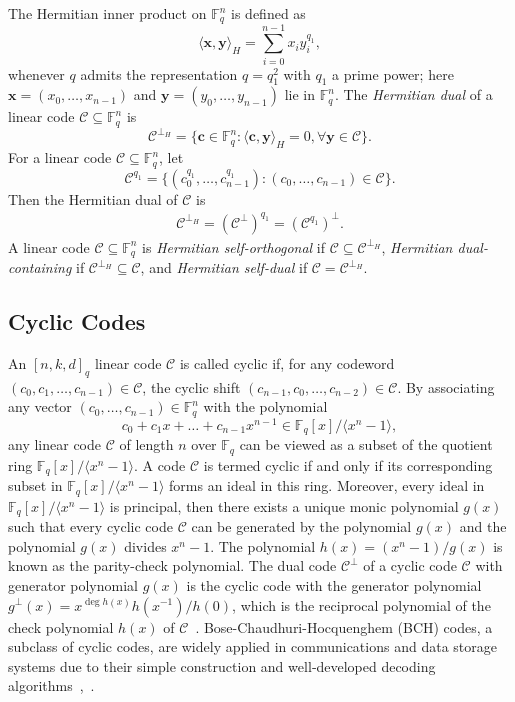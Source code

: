 \documentclass[journal,12pt,onecolumn]{IEEEtran}
\begin{document}
The Hermitian inner product on $\mathbb{F}_q^n$ is defined as
\[
\langle \mathbf{x}, \mathbf{y} \rangle_H = \sum_{i=0}^{n-1} x_i y_i^{q_1},
\]
whenever $q$ admits the representation $q = q_1^2$ with $q_1$ a prime power; here $\mathbf{x} = (x_0,\dots,x_{n-1})$ and $\mathbf{y} = (y_0,\dots,y_{n-1})$ lie in $\mathbb{F}_q^n$.  The \textit{Hermitian dual} of a linear code $\mathcal{C}\subseteq\mathbb{F}_q^n$ is \[\mathcal{C}^{\perp_H}=\{\textbf{c}\in \mathbb{F}_q^n:\langle\textbf{c},\textbf{y}\rangle_H=0,\forall\textbf{y}\in \mathcal{C}\}.\]
For a linear code $\mathcal{C}\subseteq\mathbb{F}_q^n$, let\[\mathcal{C}^{q_1}=\{(c_0^{q_1},\dots,c_{n-1}^{q_1}):(c_0,\dots,c_{n-1})\in\mathcal{C}\}.\]
Then the Hermitian dual of $\mathcal{C}$ is
\begin{align}
    \label{(1)}
    \mathcal{C}^{\perp_H}=(\mathcal{C}^\perp)^{q_1}=(\mathcal{C}^{q_1})^\perp.
\end{align}
A linear code $\mathcal{C}\subseteq\mathbb{F}_q^n$ is \textit{Hermitian self-orthogonal} if $\mathcal{C}\subseteq \mathcal{C}^{\perp_H}$, \textit{Hermitian dual-containing} if $\mathcal{C}^{\perp_H}\subseteq\mathcal{C}$, and \textit{Hermitian self-dual} if $\mathcal{C}=\mathcal{C}^{\perp_H}$.

\subsection{Cyclic Codes}
An $[n,k,d]_q$ linear code $\mathcal{C}$ is called cyclic if, for any codeword $(c_0,c_1,\dots,c_{n-1})\in\mathcal{C}$, the cyclic shift $(c_{n-1},c_0,\dots,c_{n-2})\in\mathcal{C}$. By associating any vector $(c_0,\dots,c_{n-1})\in\mathbb{F}_q^n$ with the polynomial \[c_0+c_1x+\dots +c_{n-1}x^{n-1}\in\mathbb{F}_q[x]/\langle x^n-1\rangle,\]
any linear code $\mathcal{C}$ of length $n$ over $\mathbb{F}_q$ can be viewed as a subset of the quotient ring $\mathbb{F}_q[x]/\langle x^n-1\rangle$. A code $\mathcal{C}$ is termed cyclic if and only if its corresponding subset in $\mathbb{F}_q[x]/\langle x^n-1\rangle$ forms an ideal in this ring. Moreover, every ideal in $\mathbb{F}_q[x]/\langle x^n-1\rangle$ is principal, then there exists a unique monic polynomial $g(x)$ such that every cyclic code $\mathcal{C}$ can be generated by the polynomial $g(x)$ and the polynomial $g(x)$ divides $x^n-1$. The polynomial $h(x)=(x^n-1)/g(x)$ is known as the parity-check polynomial. The dual code $\mathcal{C}^\perp$ of a cyclic code $\mathcal{C}$ with generator polynomial $g(x)$ is the cyclic code with the generator polynomial $g^\perp(x)=x^{\deg h(x)}h(x^{-1})/h(0)$, which is the reciprocal polynomial of the check polynomial $h(x)$ of $\mathcal{C}$~\cite{Roman1992Coding}. Bose-Chaudhuri-Hocquenghem (BCH) codes, a subclass of cyclic codes, are widely applied in communications and data storage systems due to their simple construction and well‑developed decoding algorithms~\cite{Bose1960a},~\cite{Hocquenghem1959}.
\end{document}
